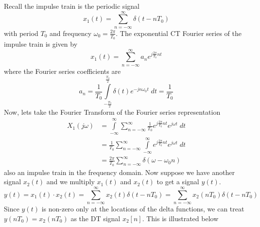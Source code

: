 Recall the impulse train is the periodic signal
\[
x_1(t) = \sum\limits_{n=-\infty}^{\infty} \delta(t-nT_0)
\]
with period $T_0$ and frequency $\omega_0 = \tfrac{2\pi}{T_0}$. The exponential CT Fourier series of the impulse train is given by
\[
x_1(t) = \sum\limits_{n=-\infty}^{\infty} a_n e^{j\tfrac{2\pi}{T_0}nt}
\]
where the Fourier series coefficients are
\[
a_n = \frac{1}{T_0} \int\limits_{-\frac{T_0}{2}}^{\frac{T_0}{2}} \delta(t) e^{-jn\omega_0 t} \; dt = \frac{1}{T_0} 
\]
Now, lets take the Fourier Transform of the Fourier series representation
\begin{align*}
X_1(j\omega) &= \int\limits_{-\infty}^{\infty} \sum\limits_{n=-\infty}^{\infty} \frac{1}{T_0} e^{j\tfrac{2\pi}{T_0}nt}e^{j\omega t}\; dt\\
&= \frac{1}{T_0} \sum\limits_{n=-\infty}^{\infty} \int\limits_{-\infty}^{\infty} e^{j\tfrac{2\pi}{T_0}nt}e^{j\omega t}\; dt\\
&= \frac{2\pi}{T_0} \sum\limits_{n=-\infty}^{\infty} \delta(\omega - \omega_0 n)
\end{align*}
also an impulse train in the frequency domain. Now suppose we have another signal $x_2(t)$ and we multiply $x_1(t)$ and $x_2(t)$ to get a signal $y(t)$.
\[
y(t) = x_1(t) \cdot x_2(t) = \sum\limits_{n=-\infty}^{\infty} x_2(t) \delta(t-nT_0) = \sum\limits_{n=-\infty}^{\infty} x_2(nT_0) \delta(t-nT_0)
\]
Since $y(t)$ is non-zero only at the locations of the delta functions, we can treat $y(nT_0) = x_2(nT_0)$ as the DT signal $x_2[n]$. This is illustrated below

